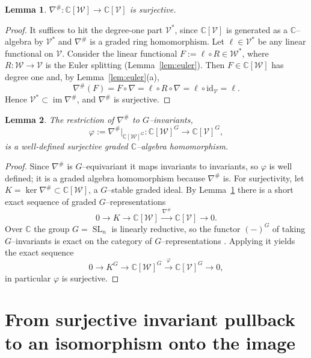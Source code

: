 \documentclass{amsart}
\newtheorem{lemma}{Lemma}
\theoremstyle{definition}
\DeclareMathOperator{\SL}{SL}
\DeclareMathOperator{\im}{im}
\newcommand{\CC}{\mathbb{C}}
\newcommand{\nab}{\nabla}
\begin{document}
\begin{lemma}\label{lem:nabsharp-surj}
$\nab^{\#}\colon \CC[\mathcal W]\to\CC[\mathcal V]$ is surjective.
\end{lemma}

\begin{proof}
It suffices to hit the degree-one part $\mathcal V^{*}$, since $\CC[\mathcal V]$ is generated
as a $\CC$--algebra by $\mathcal V^{*}$ and $\nab^{\#}$ is a graded ring homomorphism.
Let $\ell\in\mathcal V^{*}$ be any linear functional on $\mathcal V$. Consider the linear
functional $F:=\ell\circ R\in\mathcal W^{*}$, where $R\colon\mathcal W\to\mathcal V$ is the
Euler splitting (Lemma~\ref{lem:euler}). Then $F\in\CC[\mathcal W]$ has degree one and, by
Lemma~\ref{lem:euler}(a),
\[
\nab^{\#}(F)=F\circ\nab=\ell\circ R\circ\nab=\ell\circ\mathrm{id}_{\mathcal V}=\ell .
\]
Hence $\mathcal V^{*}\subset\im\nab^{\#}$, and $\nab^{\#}$ is surjective.
\end{proof}

\begin{lemma}\label{lem:phi-surj}
The restriction of $\nab^{\#}$ to $G$--invariants,
\[
\varphi:=\nab^{\#}|_{\CC[\mathcal W]^{G}}\colon \CC[\mathcal W]^{G}\longrightarrow
\CC[\mathcal V]^{G},
\]
is a well-defined surjective graded $\CC$--algebra homomorphism.
\end{lemma}

\begin{proof}
Since $\nab^{\#}$ is $G$--equivariant it maps invariants to invariants, so $\varphi$ is
well defined; it is a graded algebra homomorphism because $\nab^{\#}$ is. For surjectivity,
let $K=\ker\nab^{\#}\subset\CC[\mathcal W]$, a $G$--stable graded ideal. By
Lemma~\ref{lem:nabsharp-surj} there is a short exact sequence of graded
$G$--representations
\[
0\to K\to \CC[\mathcal W]\xrightarrow{\ \nab^{\#}\ }\CC[\mathcal V]\to 0 .
\]
Over $\CC$ the group $G=\SL_n$ is linearly reductive, so the functor $(-)^{G}$ of taking
$G$--invariants is exact on the category of $G$--representations
\cite[Ch.~1, \S 2, Reductivity]{MFK}. Applying it yields the exact sequence
\[
0\to K^{G}\to \CC[\mathcal W]^{G}\xrightarrow{\ \varphi\ }\CC[\mathcal V]^{G}\to 0 ,
\]
in particular $\varphi$ is surjective.
\end{proof}

\section{From surjective invariant pullback to an isomorphism onto the image}\label{sec:proj}
\end{document}
